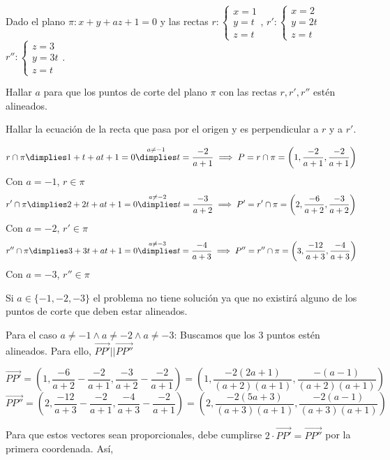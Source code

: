 \documentclass[palatino,nosec,nochap,nobuilddate]{Docencia}
\renewcommand{\vec}[1]{\overrightarrow{#1}}
\begin{document}
\begin{problem}

Dado el plano $\pi: x+y+az +1 = 0$ y las rectas $r:\begin{cases}x=1\\y=t\\z=t\end{cases}$, 
$r':\begin{cases}x=2\\y=2t\\z=t\end{cases}$
$r'':\begin{cases}z=3\\y=3t\\z=t\end{cases}$.

\ppart Hallar $a$ para que los puntos de corte del plano $\pi$ con las rectas $r,r',r''$ estén alineados.

\ppart Hallar la ecuación de la recta que pasa por el origen y es perpendicular a $r$ y a $r'$.

\solution


\spart 

\[r\cap \pi \dimplies 1 + t + at + 1 = 0 \overset{a\neq -1}{\dimplies} t = \frac{-2}{a+1}\implies P=r\cap\pi = 
\left(1,\frac{-2}{a+1},\frac{-2}{a+1}\right)\]
Con $a=-1$, $r\in\pi$
\[r'\cap \pi \dimplies 2 + 2t + at + 1 = 0 \overset{a\neq -2}{\dimplies} t = \frac{-3}{a+2}\implies P'=r'\cap\pi = 
\left(2,\frac{-6}{a+2},\frac{-3}{a+2}\right)\]
Con $a=-2$, $r'\in\pi$
\[r''\cap \pi \dimplies 3 + 3t + at + 1 = 0 \overset{a\neq -3}{\dimplies} t = \frac{-4}{a+3}\implies P''=r''\cap\pi =
\left(3,\frac{-12}{a+3},\frac{-4}{a+3}\right)\]
Con $a=-3$, $r''\in\pi$

Si $a\in\{-1,-2,-3\}$ el problema no tiene solución ya que no existirá alguno de los puntos de corte que deben estar alineados.

Para el caso $a\neq -1 \wedge a\neq -2 \wedge a\neq -3$: Buscamos que los 3 puntos estén alineados. Para ello, $\vec{PP'}||\vec{PP''}$

\[
	\vec{PP'} =
	\left(1,	 \frac{-6}{a+2}- \frac{-2}{a+1},	\frac{-3}{a+2}-\frac{-2}{a+1}\right) =
	\left(1,\frac{-2(2a+1)}{(a+2)(a+1)},\frac{-(a-1)}{(a+2)(a+1)}\right)
\]
\[
	\vec{PP''} =
	 \left(2, \frac{-12}{a+3}-\frac{-2}{a+1},\frac{-4}{a+3}-\frac{-2}{a+1}\right) = 
	 \left(2,\frac{-2(5a+3)}{(a+3)(a+1)},\frac{-2(a-1)}{(a+3)(a+1)} \right)
\]

Para que estos vectores sean proporcionales, debe cumplirse $2·\vec{PP'} = \vec{PP''}$ por la primera coordenada. Así,


\end{problem}
\end{document}
